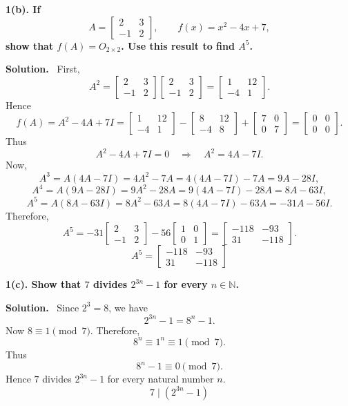 \documentclass[11pt,a4paper]{article}
\newcommand{\question}[1]{\vspace{4pt}\begin{tcolorbox}[colback=softblue,colframe=headblue,boxrule=0.6pt,arc=2pt,left=5pt,right=5pt,top=4pt,bottom=4pt]\textbf{#1}\end{tcolorbox}}
\newcommand{\answer}{\textbf{Solution.}~}
\newcommand{\finalans}[1]{\[\boxed{#1}\]}
\begin{document}
\question{1(b). If
\[
A=\begin{bmatrix}2&3\\-1&2\end{bmatrix},\qquad f(x)=x^2-4x+7,
\]
show that $f(A)=O_{2\times2}$. Use this result to find $A^5$.}
\answer
First,
\[
A^2=\begin{bmatrix}2&3\\-1&2\end{bmatrix}
\begin{bmatrix}2&3\\-1&2\end{bmatrix}
=\begin{bmatrix}1&12\\-4&1\end{bmatrix}.
\]
Hence
\[
f(A)=A^2-4A+7I
=\begin{bmatrix}1&12\\-4&1\end{bmatrix}
-\begin{bmatrix}8&12\\-4&8\end{bmatrix}
+\begin{bmatrix}7&0\\0&7\end{bmatrix}
=\begin{bmatrix}0&0\\0&0\end{bmatrix}.
\]
Thus
\[
A^2-4A+7I=0\quad\Rightarrow\quad A^2=4A-7I.
\]
Now,
\[
A^3=A(4A-7I)=4A^2-7A=4(4A-7I)-7A=9A-28I,
\]
\[
A^4=A(9A-28I)=9A^2-28A=9(4A-7I)-28A=8A-63I,
\]
\[
A^5=A(8A-63I)=8A^2-63A=8(4A-7I)-63A=-31A-56I.
\]
Therefore,
\[
A^5=-31\begin{bmatrix}2&3\\-1&2\end{bmatrix}-56\begin{bmatrix}1&0\\0&1\end{bmatrix}
=\begin{bmatrix}-118&-93\\31&-118\end{bmatrix}.
\]
\finalans{A^5=\begin{bmatrix}-118&-93\\31&-118\end{bmatrix}}

\question{1(c). Show that $7$ divides $2^{3n}-1$ for every $n\in\mathbb{N}$.}
\answer
Since $2^3=8$, we have
\[
2^{3n}-1=8^n-1.
\]
Now $8\equiv1\pmod 7$. Therefore,
\[
8^n\equiv1^n\equiv1\pmod 7.
\]
Thus
\[
8^n-1\equiv0\pmod 7.
\]
Hence $7$ divides $2^{3n}-1$ for every natural number $n$.
\finalans{7\mid(2^{3n}-1)}
\end{document}
